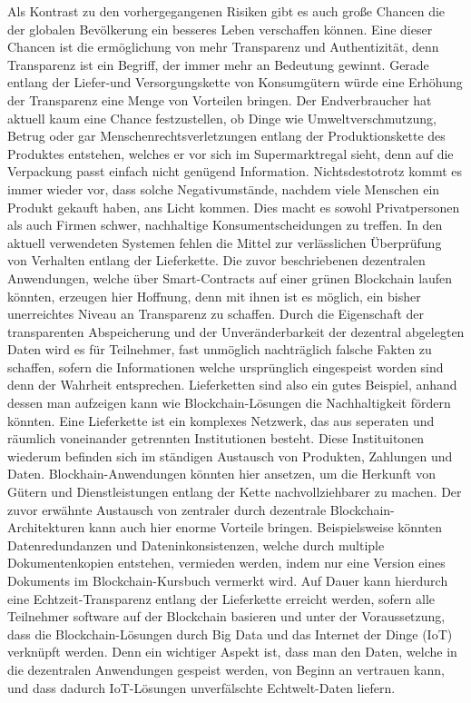 Als Kontrast zu den vorhergegangenen Risiken gibt es auch große Chancen die der globalen Bevölkerung ein besseres Leben verschaffen können. Eine dieser Chancen ist die ermöglichung von mehr Transparenz und Authentizität, denn
Transparenz ist ein Begriff, der immer mehr an Bedeutung gewinnt. Gerade entlang der Liefer-und Versorgungskette von Konsumgütern würde eine Erhöhung der Transparenz eine Menge von Vorteilen bringen. Der Endverbraucher hat aktuell kaum eine Chance festzustellen, ob Dinge wie Umweltverschmutzung, Betrug oder gar Menschenrechtsverletzungen entlang der Produktionskette des Produktes entstehen, welches er vor sich im Supermarktregal sieht, denn auf die Verpackung passt einfach nicht genügend Information. Nichtsdestotrotz kommt es immer wieder vor, dass solche Negativumstände, nachdem viele Menschen ein Produkt gekauft haben, ans Licht kommen. Dies macht es sowohl Privatpersonen als auch Firmen schwer, nachhaltige Konsumentscheidungen zu treffen. In den aktuell verwendeten Systemen fehlen die Mittel zur verlässlichen Überprüfung von Verhalten entlang der Lieferkette\cite{lieferketteVerbraucherZentrale}. Die zuvor beschriebenen dezentralen Anwendungen, welche über Smart-Contracts auf einer grünen Blockchain laufen könnten, erzeugen hier Hoffnung, denn mit ihnen ist es möglich, ein bisher unerreichtes Niveau an Transparenz zu schaffen. Durch die Eigenschaft der transparenten Abspeicherung und der Unveränderbarkeit der dezentral abgelegten Daten wird es für Teilnehmer, fast unmöglich nachträglich falsche Fakten zu schaffen, sofern die Informationen welche ursprünglich eingespeist worden sind denn der Wahrheit entsprechen. Lieferketten sind also ein gutes Beispiel, anhand dessen man aufzeigen kann wie Blockchain-Lösungen die Nachhaltigkeit fördern könnten.\cite{supplyChainPaper} Eine Lieferkette ist ein komplexes Netzwerk, das aus seperaten und räumlich voneinander getrennten Institutionen besteht. Diese Instituitonen wiederum befinden sich im ständigen Austausch von Produkten, Zahlungen und Daten. Blockhain-Anwendungen könnten hier ansetzen, um die Herkunft von Gütern und Dienstleistungen entlang der Kette nachvollziehbarer zu machen. Der zuvor erwähnte Austausch von zentraler durch dezentrale Blockchain-Architekturen kann auch hier enorme Vorteile bringen. Beispielsweise könnten Datenredundanzen und Dateninkonsistenzen, welche durch multiple Dokumentenkopien entstehen, vermieden werden, indem nur eine Version eines Dokuments im Blockchain-Kursbuch vermerkt wird. Auf Dauer kann hierdurch eine Echtzeit-Transparenz entlang der Lieferkette erreicht werden, sofern alle Teilnehmer software auf der Blockchain basieren und unter der Voraussetzung, dass die Blockchain-Lösungen durch Big Data und das Internet der Dinge (IoT) verknüpft werden. Denn ein wichtiger Aspekt ist, dass man den Daten, welche in die dezentralen Anwendungen gespeist werden, von Beginn an vertrauen kann, und dass dadurch IoT-Lösungen unverfälschte Echtwelt-Daten liefern.\newline
